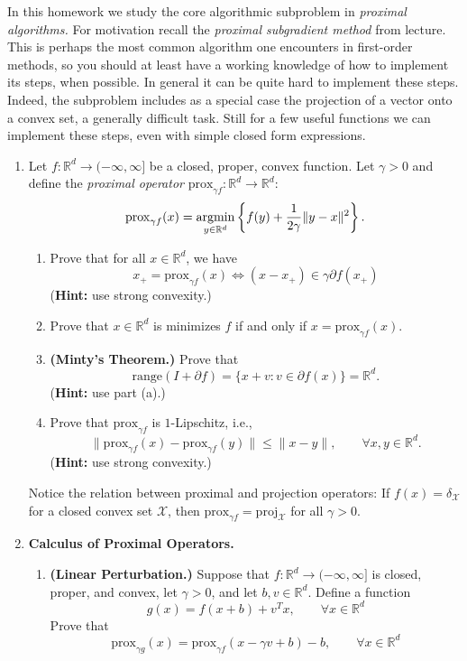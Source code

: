 \documentclass[12pt]{article}
\numberwithin{equation}{section}
\newcommand{\RR}{\mathbb{R}}
\newcommand{\cX}{\mathcal{X}}
\newcommand{\range}{\mathrm{range}}
\newcommand{\prox}{\mathrm{prox}}
\newcommand{\proj}{\mathrm{proj}}
\newcommand{\argmin}{\operatornamewithlimits{argmin}}
\theoremstyle{remark}
\begin{document}
In this homework we study the core algorithmic subproblem in \emph{proximal algorithms.}
For motivation recall the \emph{proximal subgradient method} from lecture. 
This is perhaps the most common algorithm one encounters in first-order methods, so you should at least have a working knowledge of how to implement its steps, when possible.
In general it can be quite hard to implement these steps. 
Indeed, the subproblem includes as a special case the projection of a vector onto a convex set, a generally difficult task.
Still for a few useful functions we can implement these steps, even with simple closed form expressions.
\begin{enumerate}
\item Let $f \colon \RR^d \rightarrow (-\infty, \infty]$ be a closed, proper, convex function. Let $\gamma > 0$ and define the \emph{proximal operator} $\prox_{\gamma f}  \colon \RR^d \rightarrow \RR^d$:
$$
\prox_{\gamma f}(x) = \argmin_{y \in \RR^d} \left\{ f(y) + \frac{1}{2\gamma} \|y - x\|^2\right\}.
$$
\begin{enumerate}
\item Prove that for all $x \in \RR^d$, we have
$$
x_+ = \prox_{\gamma f} (x) \iff (x - x_+) \in \gamma \partial f(x_+)
$$
({\bf Hint:} use strong convexity.)
\item Prove that $x \in \RR^d$ is minimizes $f$ if and only if $x = \prox_{\gamma f}(x)$. 
\item {\bf (Minty's Theorem.)} Prove that 
$$
\range(I + \partial f) = \{ x + v \colon v \in \partial f(x) \} = \RR^d.
$$
({\bf Hint:} use part (a).)
\item \Coffeecup Prove that $\prox_{\gamma f}$ is $1$-Lipschitz, i.e., 
$$
\|\prox_{\gamma f}(x) - \prox_{\gamma f}(y)\| \leq \|x - y\|, \qquad \forall x, y \in \RR^d.
$$
({\bf Hint:} use strong convexity.)
\end{enumerate}
Notice the relation between proximal and projection operators: If $f(x) = \delta_{\cX}$ for a closed convex set $\cX$, then $\prox_{\gamma f} = \proj_{\cX}$ for all $\gamma > 0$. 
\item {\bf Calculus of Proximal Operators.} 
\begin{enumerate}
\item {\bf (Linear Perturbation.)} Suppose that $f \colon \RR^d \rightarrow (-\infty, \infty]$ is closed, proper, and convex, let $\gamma > 0$, and let $b, v \in \RR^d$. Define a function 
$$
g(x) = f(x + b) + v^T x, \qquad \forall x \in \RR^d
$$
Prove that 
$$
\prox_{\gamma g}(x) = \prox_{\gamma f}(x - \gamma v + b) - b, \qquad \forall x \in \RR^d
$$
\end{enumerate}
\end{enumerate}
\end{document}
